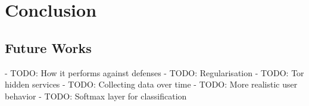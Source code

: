 \section{Conclusion}

\subsection{Future Works}
- TODO: How it performs against defenses
- TODO: Regularisation
- TODO: Tor hidden services
- TODO: Collecting data over time
- TODO: More realistic user behavior
- TODO: Softmax layer for classification
